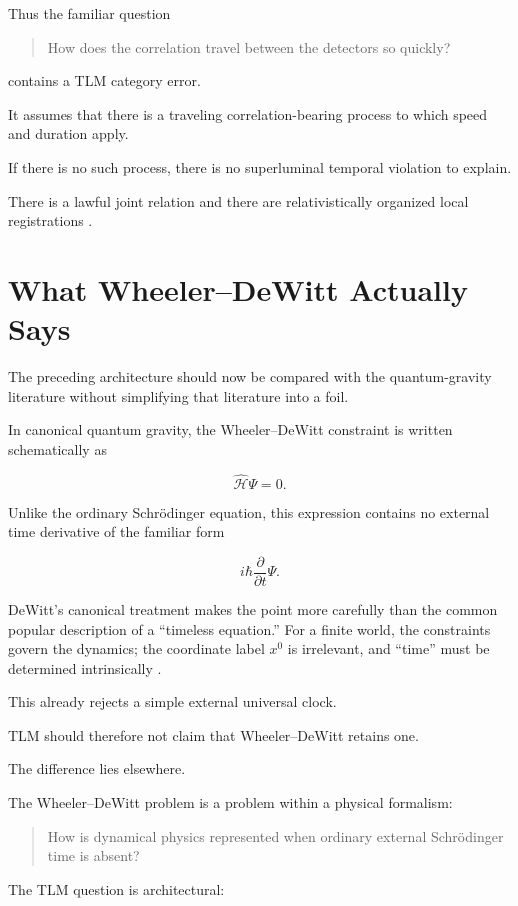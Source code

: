 \documentclass[12pt,onecolumn]{article}
\theoremstyle{plain}
\theoremstyle{definition}
\theoremstyle{remark}
\begin{document}
Thus the familiar question

\begin{quote}
How does the correlation travel between the detectors so quickly?
\end{quote}

contains a TLM category error.

It assumes that there is a traveling correlation-bearing process to which
speed and duration apply.

If there is no such process, there is no superluminal temporal violation to
explain.

There is a lawful joint relation and there are relativistically organized
local registrations \cite{unified2026}.


\section{What Wheeler--DeWitt Actually Says}

The preceding architecture should now be compared with the quantum-gravity
literature without simplifying that literature into a foil.

In canonical quantum gravity, the Wheeler--DeWitt constraint is written
schematically as

\[
\hat{\mathcal H}\Psi=0.
\]

Unlike the ordinary Schr\"odinger equation, this expression contains no
external time derivative of the familiar form

\[
i\hbar\frac{\partial}{\partial t}\Psi.
\]

DeWitt's canonical treatment makes the point more carefully than the common
popular description of a ``timeless equation.'' For a finite world, the
constraints govern the dynamics; the coordinate label \(x^0\) is irrelevant,
and ``time'' must be determined intrinsically \cite{dewitt1967}.

This already rejects a simple external universal clock.

TLM should therefore not claim that Wheeler--DeWitt retains one.

The difference lies elsewhere.

The Wheeler--DeWitt problem is a problem within a physical formalism:

\begin{quote}
How is dynamical physics represented when ordinary external Schr\"odinger
time is absent?
\end{quote}

The TLM question is architectural:
\end{document}
